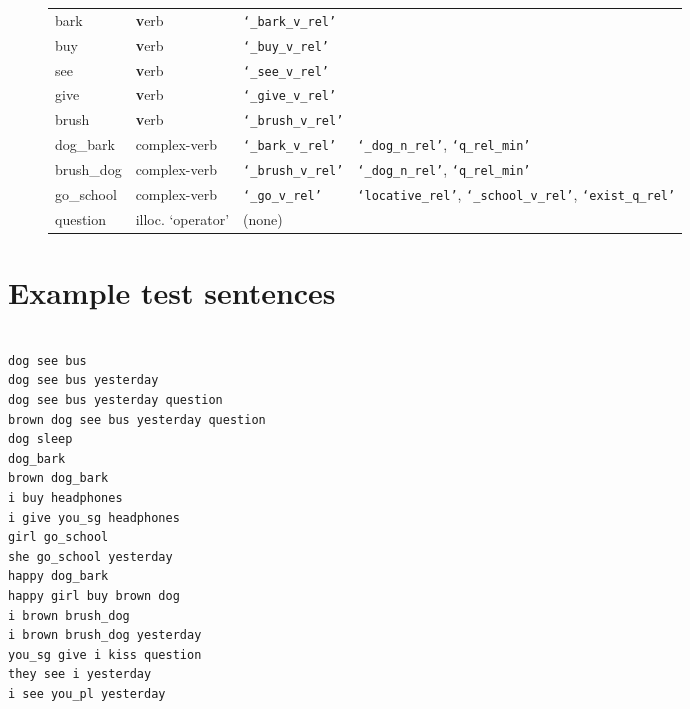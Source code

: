 \begin{figure}[h!]
\begin{tabular}{ | p{3.5cm} | p{3.5cm} | p{3.5cm} | p{3.5cm} | }
    bark       & \textbf{v}erb     & \texttt{`\_bark\_v\_rel'}         &        \\
    buy        & \textbf{v}erb     & \texttt{`\_buy\_v\_rel'}         &        \\
    see        & \textbf{v}erb     & \texttt{`\_see\_v\_rel'}         &        \\
    give       & \textbf{v}erb     & \texttt{`\_give\_v\_rel'}         &        \\
    brush      & \textbf{v}erb     &         \texttt{`\_brush\_v\_rel'} &        \\
    dog\_bark  & complex-verb & \texttt{`\_bark\_v\_rel'} & \texttt{`\_dog\_n\_rel'}, \texttt{`q\_rel\_min'}          \\
    brush\_dog & complex-verb & \texttt{`\_brush\_v\_rel'} & \texttt{`\_dog\_n\_rel'}, \texttt{`q\_rel\_min'}      \\
    go\_school & complex-verb & \texttt{`\_go\_v\_rel'}   & \texttt{`locative\_rel'}, \texttt{`\_school\_v\_rel'}, \texttt{`exist\_q\_rel'} \\
    question   & illoc. `operator' &  (none)   &   \\
    \hline
\end{tabular}

\end{figure}

%
%
%


\chapter{Example test sentences}

\begin{verbatim}

dog see bus
dog see bus yesterday
dog see bus yesterday question
brown dog see bus yesterday question
dog sleep
dog_bark
brown dog_bark
i buy headphones
i give you_sg headphones
girl go_school
she go_school yesterday
happy dog_bark
happy girl buy brown dog
i brown brush_dog
i brown brush_dog yesterday
you_sg give i kiss question
they see i yesterday
i see you_pl yesterday

\end{verbatim}


